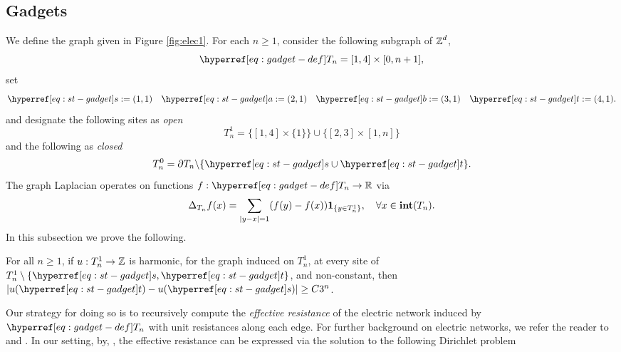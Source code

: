 \documentclass[12pt]{amsart}
\numberwithin{equation}{section}
\begin{document}
	\subsection{Gadgets} \label{subsec:gadget-def}
	We define the graph given in Figure \ref{fig:elec1}.
	For each $n \geq 1$, consider the following subgraph of $\operatorname{\mathbb{Z}}^d$, 
	\begin{equation} \label{eq:gadget-def}
		\Tn{n} =  [1,4] \times [0,n+1],
	\end{equation}
	set
	\begin{equation} \label{eq:st-gadget}
		\sgadget := (1,1) \quad \agadget := (2,1) \quad \bgadget := (3,1) \quad \tgadget := (4,1). 
	\end{equation}
	and designate the following sites as {\it open}
	\begin{equation}
		T^{1}_n =  \{[1,4] \times \{ 1 \} \}   \cup \{[2,3] \times [1,n]\}
	\end{equation}
	and the following as {\it closed}
	\begin{equation}
		T^{0}_n =  \partial T_n  \backslash \{  \sgadget \cup \tgadget \}.
	\end{equation}
	The graph Laplacian operates on functions  $f: \Tn{n} \to \R$ via
	\begin{equation}
		\Delta_{{T_{n}}} f(x) = \sum_{|y-x| =1} ( f(y) - f(x)) \mathbf{1}_{\{ y \in T^{1}_n\}}, \quad \forall x \in \operatorname{\mathbf{int}}(T_n).
	\end{equation}
	In this subsection we prove the following. 
	\begin{prop} \label{prop:exponential-growth-gadget}
		For all $n \geq 1$, if $u: T^{1}_n \to \operatorname{\mathbb{Z}}$ is harmonic, for the graph induced on $T^{1}_n$, at every site of $T^{1}_n \setminus \{ \sgadget , \tgadget \}$, 
		and non-constant, then  $|u(\tgadget) - u(\sgadget)| \geq C 3^n$. 
	\end{prop}
	Our strategy for doing so is to recursively compute the {\it effective resistance} of the electric network induced by $\Tn{n}$ with unit 
	resistances along each edge. For further background on electric networks, we refer the reader to \cite{doyle-snell-electric-networks} and 
	\cite[Section 2.2]{lyons-peres-book}. In our setting, by, \eg,  \cite[Equation (2.5)]{lyons-peres-book} the effective resistance can be expressed via the solution to the following Dirichlet problem  
\end{document}
